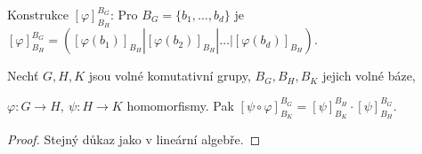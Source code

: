 Konstrukce $[\varphi]_{B_H}^{B_G}$: Pro $B_G=\{b_1,\ldots,b_d\}$ je $[\varphi]_{B_H}^{B_G} = ([\varphi(b_1)]_{B_H}|[\varphi(b_2)]_{B_H}| \dots | [\varphi(b_d)]_{B_H})$.

\begin{claim}
Nechť $G, H, K$ jsou volné komutativní grupy, $B_G, B_H, B_K$ jejich volné báze, 

$\varphi:G\rightarrow H, \ \psi:H\rightarrow K$ homomorfismy. Pak $[\psi \circ \varphi]_{B_K}^{B_G} = [\psi]_{B_K}^{B_H} \cdot [\psi]_{B_H}^{B_G}$.
\end{claim}
\begin{proof}
Stejný důkaz jako v lineární algebře.
\end{proof}